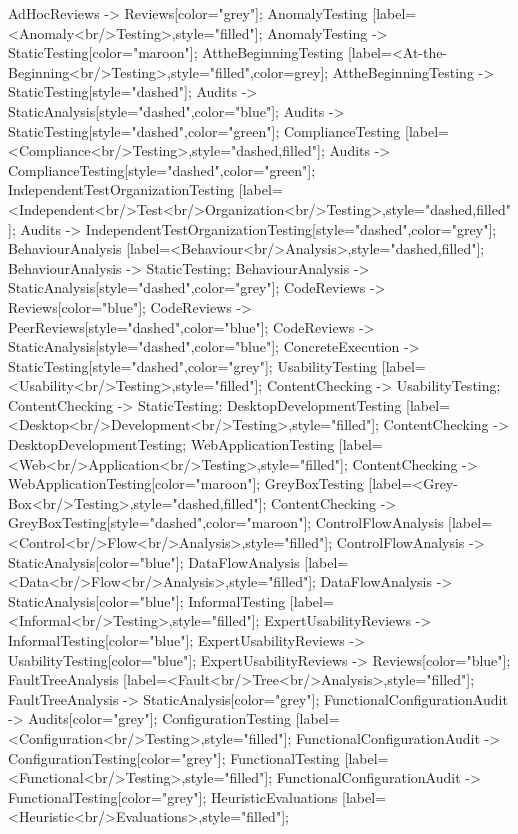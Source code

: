\documentclass{article}
\begin{document}
{AdHocReviews -> Reviews[color="grey"];
AnomalyTesting [label=<Anomaly<br/>Testing>,style="filled"];
AnomalyTesting -> StaticTesting[color="maroon"];
AttheBeginningTesting [label=<At-the-Beginning<br/>Testing>,style="filled",color=grey];
AttheBeginningTesting -> StaticTesting[style="dashed"];
Audits -> StaticAnalysis[style="dashed",color="blue"];
Audits -> StaticTesting[style="dashed",color="green"];
ComplianceTesting [label=<Compliance<br/>Testing>,style="dashed,filled"];
Audits -> ComplianceTesting[style="dashed",color="green"];
IndependentTestOrganizationTesting [label=<Independent<br/>Test<br/>Organization<br/>Testing>,style="dashed,filled"];
Audits -> IndependentTestOrganizationTesting[style="dashed",color="grey"];
BehaviourAnalysis [label=<Behaviour<br/>Analysis>,style="dashed,filled"];
BehaviourAnalysis -> StaticTesting;
BehaviourAnalysis -> StaticAnalysis[style="dashed",color="grey"];
CodeReviews -> Reviews[color="blue"];
CodeReviews -> PeerReviews[style="dashed",color="blue"];
CodeReviews -> StaticAnalysis[style="dashed",color="blue"];
ConcreteExecution -> StaticTesting[style="dashed",color="grey"];
UsabilityTesting [label=<Usability<br/>Testing>,style="filled"];
ContentChecking -> UsabilityTesting;
ContentChecking -> StaticTesting;
DesktopDevelopmentTesting [label=<Desktop<br/>Development<br/>Testing>,style="filled"];
ContentChecking -> DesktopDevelopmentTesting;
WebApplicationTesting [label=<Web<br/>Application<br/>Testing>,style="filled"];
ContentChecking -> WebApplicationTesting[color="maroon"];
GreyBoxTesting [label=<Grey-Box<br/>Testing>,style="dashed,filled"];
ContentChecking -> GreyBoxTesting[style="dashed",color="maroon"];
ControlFlowAnalysis [label=<Control<br/>Flow<br/>Analysis>,style="filled"];
ControlFlowAnalysis -> StaticAnalysis[color="blue"];
DataFlowAnalysis [label=<Data<br/>Flow<br/>Analysis>,style="filled"];
DataFlowAnalysis -> StaticAnalysis[color="blue"];
InformalTesting [label=<Informal<br/>Testing>,style="filled"];
ExpertUsabilityReviews -> InformalTesting[color="blue"];
ExpertUsabilityReviews -> UsabilityTesting[color="blue"];
ExpertUsabilityReviews -> Reviews[color="blue"];
FaultTreeAnalysis [label=<Fault<br/>Tree<br/>Analysis>,style="filled"];
FaultTreeAnalysis -> StaticAnalysis[color="grey"];
FunctionalConfigurationAudit -> Audits[color="grey"];
ConfigurationTesting [label=<Configuration<br/>Testing>,style="filled"];
FunctionalConfigurationAudit -> ConfigurationTesting[color="grey"];
FunctionalTesting [label=<Functional<br/>Testing>,style="filled"];
FunctionalConfigurationAudit -> FunctionalTesting[color="grey"];
HeuristicEvaluations [label=<Heuristic<br/>Evaluations>,style="filled"];
}
\end{document}
